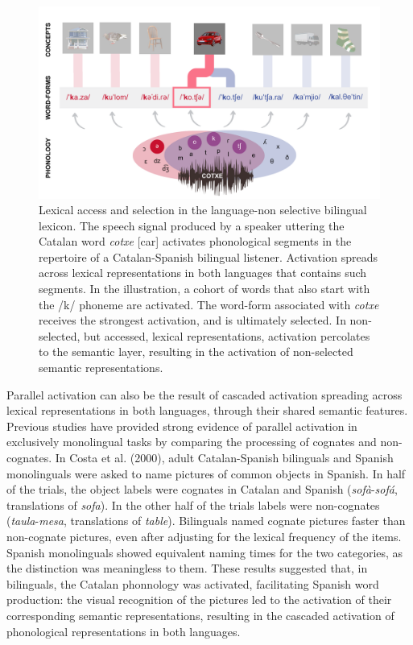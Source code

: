 \documentclass[
  12pt,
  b5paperpaper,
  twoside]{scrreprt}
\begin{document}
\begin{figure}

{\centering \includegraphics{chapters/../_assets/img/lexicon.png}

}

\caption{\label{fig-lexicon}Lexical access and selection in the
language-non selective bilingual lexicon. The speech signal produced by
a speaker uttering the Catalan word \emph{cotxe} {[}car{]} activates
phonological segments in the repertoire of a Catalan-Spanish bilingual
listener. Activation spreads across lexical representations in both
languages that contains such segments. In the illustration, a cohort of
words that also start with the /k/ phoneme are activated. The word-form
associated with \emph{cotxe} receives the strongest activation, and is
ultimately selected. In non-selected, but accessed, lexical
representations, activation percolates to the semantic layer, resulting
in the activation of non-selected semantic representations.}

\end{figure}

Parallel activation can also be the result of cascaded activation
spreading across lexical representations in both languages, through
their shared semantic features. Previous studies have provided strong
evidence of parallel activation in exclusively monolingual tasks by
comparing the processing of cognates and non-cognates. In Costa et al.
(2000), adult Catalan-Spanish bilinguals and Spanish monolinguals were
asked to name pictures of common objects in Spanish. In half of the
trials, the object labels were cognates in Catalan and Spanish
(\emph{sofà}-\emph{sofá}, translations of \emph{sofa}). In the other
half of the trials labels were non-cognates (\emph{taula}-\emph{mesa},
translations of \emph{table}). Bilinguals named cognate pictures faster
than non-cognate pictures, even after adjusting for the lexical
frequency of the items. Spanish monolinguals showed equivalent naming
times for the two categories, as the distinction was meaningless to
them. These results suggested that, in bilinguals, the Catalan
phonnology was activated, facilitating Spanish word production: the
visual recognition of the pictures led to the activation of their
corresponding semantic representations, resulting in the cascaded
activation of phonological representations in both languages.
\end{document}
